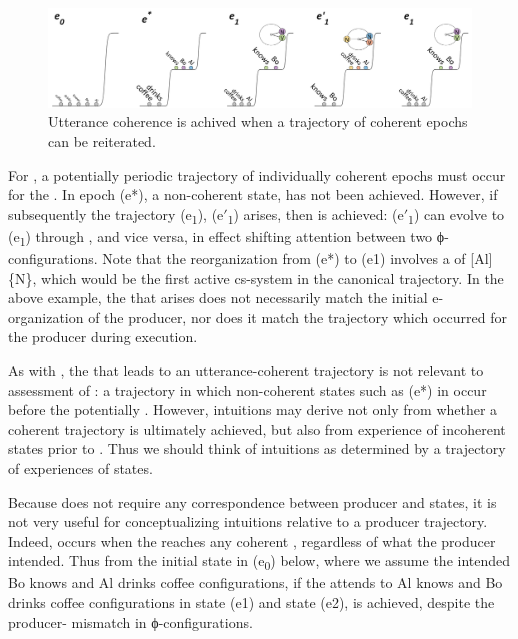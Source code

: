 \begin{figure}
\includegraphics[width=\textwidth]{figures/Tilsen-img125.png}
\caption{Utterance coherence is achived when a trajectory of coherent epochs can be reiterated.}
\label{fig:6:6}
\end{figure}
 
  For , a potentially periodic trajectory of individually coherent epochs must occur for the . In epoch (e*), a non-coherent state,  has not been achieved. However, if subsequently the trajectory (e\textsubscript{1}), (e$′$\textsubscript{1}) arises, then  is achieved: (e$′$\textsubscript{1}) can evolve to (e\textsubscript{1}) through , and vice versa, in effect shifting attention between two ϕ-con\-fi\-gu\-ra\-tions. Note that the reorganization from (e*) to (e1) involves a  of [Al]\{N\}, which would be the first active cs-sys\-tem in the canonical trajectory. In the above example, the  that arises does not necessarily match the initial e-or\-ga\-ni\-za\-tion of the producer, nor does it match the trajectory which occurred for the producer during execution.

  As with , the  that leads to an ut\-ter\-ance-coherent trajectory is not relevant to assessment of : a trajectory in which non-coherent states such as (e*) in {} occur before the potentially . However,  intuitions may derive not only from whether a coherent trajectory is ultimately achieved, but also from experience of incoherent states prior to . Thus we should think of  intuitions as determined by a trajectory of experiences of states.

  Because  does not require any correspondence between producer and  states, it is not very useful for conceptualizing  intuitions relative to a producer trajectory. Indeed,  occurs when the  reaches any coherent , regardless of what the producer intended. Thus from the initial state in (e\textsubscript{0}) below, where we assume the  intended {\textbar}Bo knows{\textbar} and {\textbar}Al drinks coffee{\textbar} configurations, if the  attends to {\textbar}Al knows{\textbar} and {\textbar}Bo drinks coffee{\textbar} configurations in state (e1) and state (e2),  is achieved, despite the producer- mismatch in ϕ-con\-fi\-gu\-ra\-tions.

